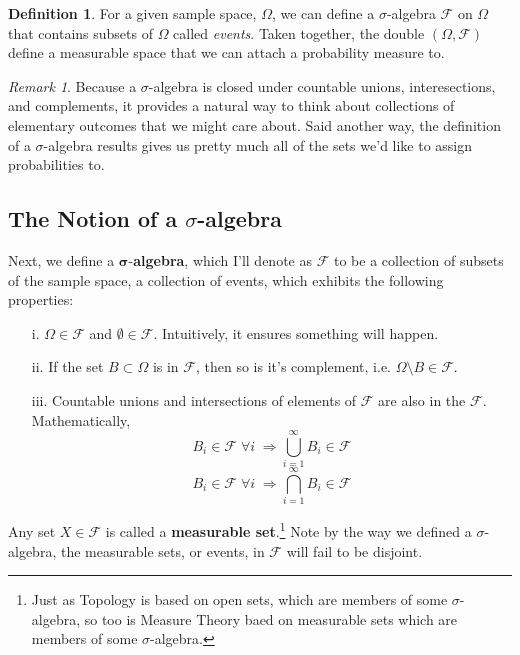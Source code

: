 \documentclass[a4paper,12pt]{article}
\theoremstyle{plain}
\theoremstyle{definition}
\newtheorem{defn}[thm]{Definition}
\theoremstyle{remark}
\newtheorem*{rmk}{Remark}
\begin{document}
\begin{defn}
For a given sample space, $\Omega$, we can define a $\sigma$-algebra
$\mathscr{F}$ on $\Omega$ that contains subsets of $\Omega$ called
\emph{events}. Taken together, the double $(\Omega,\mathscr{F})$ define
a measurable space that we can attach a probability measure to.
\end{defn}
\begin{rmk}
Because a $\sigma$-algebra is closed under countable unions,
interesections, and complements, it provides a natural way to think
about collections of elementary outcomes that we might care about. Said
another way, the definition of a $\sigma$-algebra results gives us
pretty much all of the sets we'd like to assign probabilities to.
\end{rmk}

\subsection{The Notion of a $\sigma$-algebra}

Next, we define a $\mathbf{\sigma}$-\textbf{algebra},
which I'll denote as
$\mathcal{F}$ to be a collection of subsets of the sample space, a
collection of events, which
exhibits the following properties:
\begin{itemize}
   \item[i.] $\Omega \in \mathcal{F}$ and $\emptyset \in \mathcal{F}$.
      Intuitively, it ensures something will happen.
   \item[ii.] If the set $B \subset \Omega$ is in $\mathcal{F}$,
      then so is it's complement, i.e. $\Omega \setminus B \in
      \mathcal{F}$.
   \item[iii.] Countable unions and intersections of elements of
      $\mathcal{F}$ are also in the $\mathcal{F}$.  Mathematically,
      \[ B_i \in \mathcal{F} \; \forall i \; \Rightarrow
	 \bigcup_{i=1}^{\infty} B_i \in \mathcal{F} \]
      \[ B_i \in \mathcal{F} \; \forall i \; \Rightarrow
	 \bigcap_{i=1}^{\infty} B_i \in \mathcal{F} \]
\end{itemize}
Any set $X \in \mathcal{F}$ is called a
\textbf{measurable set}.\footnote{Just as Topology is based on open
sets, which are members of some $\sigma$-algebra, so too is Measure
Theory baed on measurable sets which are members of some
$\sigma$-algebra.} Note by the way we defined a $\sigma$-algebra,
the measurable sets, or events, in $\mathcal{F}$ will fail to be
disjoint.
\end{document}
